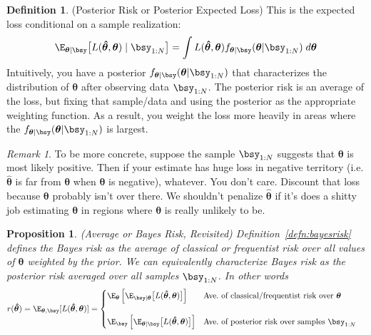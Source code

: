 \documentclass[12pt]{article}
\theoremstyle{plain}
\newtheorem{prop}[thm]{Proposition}
\theoremstyle{definition}
\newtheorem{defn}[thm]{Definition}
\theoremstyle{remark}
\newtheorem*{rmk}{Remark}
\newcommand{\bstheta}{\boldsymbol{\theta}}
\newcommand{\bshattheta}{\boldsymbol{\hat{\theta}}}
\begin{document}
\begin{defn}{(Posterior Risk or Posterior Expected Loss)}
This is the expected loss conditional on a sample realization:
\begin{align*}
  \E_{\bstheta|\bsy}\big[
    L(\bshattheta,\bstheta)\;|\;\bsy_{1:N}
  \big]
  =
  \int L(\bshattheta,\bstheta)
  f_{\bstheta|\bsy}(\bstheta|\bsy_{1:N}) \; d\bstheta
\end{align*}
Intuitively, you have a posterior
$f_{\bstheta|\bsy}(\bstheta|\bsy_{1:N})$ that characterizes the
distribution of $\bstheta$ after observing data $\bsy_{1:N}$. The
posterior risk is an average of the loss, but fixing that sample/data
and using the posterior as the appropriate weighting function. As a
result, you weight the loss more heavily in areas where the
$f_{\bstheta|\bsy}(\bstheta|\bsy_{1:N})$ is largest.
\end{defn}

\begin{rmk}
To be more concrete, suppose the sample $\bsy_{1:N}$ suggests that
$\bstheta$ is most likely positive.  Then if your estimate has huge loss
in negative territory (i.e. $\bshattheta$ is far from $\bstheta$ when
$\bstheta$ is negative), whatever. You don't care. Discount that loss
because $\bstheta$ probably isn't over there. We shouldn't penalize
$\bshattheta$ if it's does a shitty job estimating $\bstheta$ in regions
where $\bstheta$ is really unlikely to be.
\end{rmk}

\begin{prop}\emph{(Average or Bayes Risk, Revisited)}
\label{prop:bayesrisk}
Definition~\ref{defn:bayesrisk} defines the Bayes risk as the average of
classical or frequentist risk over all values of $\bstheta$ weighted by
the prior. We can equivalently characterize Bayes risk as the posterior
risk averaged over all samples $\bsy_{1:N}$. In other words
\begin{align*}
  r(\bshattheta)
  &= \E_{\bstheta,\bsy}[L(\bshattheta,\bstheta)]
  =
  \begin{cases}
    \E_{\bstheta}\left[
      \E_{\bsy|\bstheta}\big[
        L(\bshattheta,\bstheta)
      \big]
    \right]
    &\text{Ave.\ of classical/frequentist risk over $\bstheta$}
    \\
    \\
    \E_{\bsy}\left[
      \E_{\bstheta|\bsy}\big[L(\bshattheta,\bstheta)\big]
    \right]
    &\text{Ave.\ of posterior risk over samples $\bsy_{1:N}$} \\
  \end{cases}
\end{align*}
\end{prop}
\end{document}
